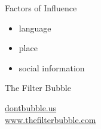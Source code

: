 \begin{frame}{Factors of Influence}
	\begin{itemize}[<+->]
		\item language
		\item place
		\item social information
	\end{itemize}
\end{frame}

\begin{frame}{The Filter Bubble}
	\begin{center}
		\href{http://dontbubble.us}{dontbubble.us}\\
		\href{http://www.thefilterbubble.com/}{www.thefilterbubble.com}
	\end{center}
\end{frame}

